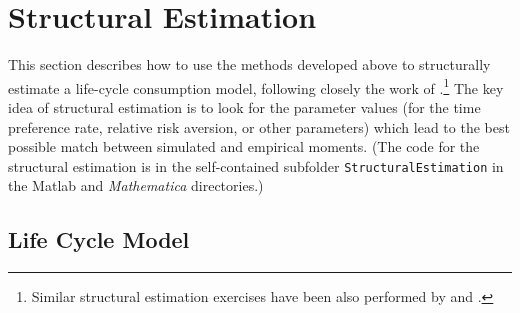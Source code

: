 \documentclass[titlepage]{\econtex}
\newcommand{\Mma}{\textit{Mathematica}}
\begin{document}
  \hypertarget{StructuralEstimation}{}
  \section{Structural Estimation}

  This section describes how to use the methods developed above to
  structurally estimate a life-cycle consumption model, following
  closely the work of
  \cite{cagettiWprofiles}.\footnote{Similar structural
    estimation exercises have been also performed by
    \cite{palumbo:medical} and \cite{gpLifecycle}.} The key idea of
  structural estimation is to look for the parameter values (for the
  time preference rate, relative risk aversion, or other parameters)
  which lead to the best possible match between simulated and empirical
  moments.  (The code for the structural estimation is in the self-contained
  subfolder \texttt{StructuralEstimation} in the Matlab and {\Mma} directories.)

  \hypertarget{LifeCycleModel}{}
  \subsection{Life Cycle Model}
\end{document}
